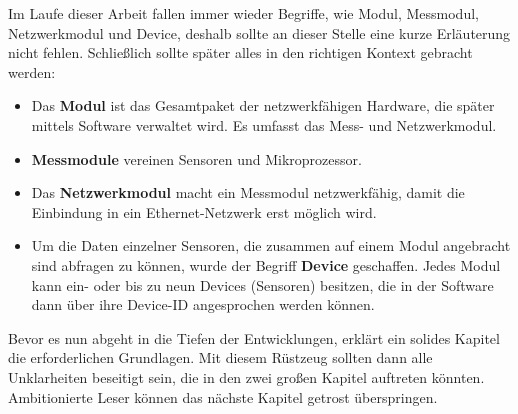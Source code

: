 \documentclass[a4paper,14pt,headsepline]{scrartcl}
\begin{document}
\newpage

\begin{figure}[h]
\begin{center}
\end{center}
\end{figure}

Im Laufe dieser Arbeit fallen immer wieder Begriffe, wie Modul, Messmodul, Netzwerkmodul und Device, deshalb sollte an dieser Stelle eine kurze Erläuterung nicht fehlen. Schließlich sollte später alles in den richtigen Kontext gebracht werden:

\begin{itemize}

\item Das \textbf{Modul} ist das Gesamtpaket der netzwerkfähigen Hardware, die später mittels Software verwaltet wird. Es umfasst das Mess- und Netzwerkmodul.
\item \textbf{Messmodule} vereinen Sensoren und Mikroprozessor. 
\item Das \textbf{Netzwerkmodul} macht ein Messmodul netzwerkfähig, damit die Einbindung in ein Ethernet-Netzwerk erst möglich wird.
\item Um die Daten einzelner Sensoren, die zusammen auf einem Modul angebracht sind abfragen zu können, wurde der Begriff \textbf{Device} geschaffen. Jedes Modul kann ein- oder bis zu neun Devices (Sensoren) besitzen, die in der Software dann über ihre Device-ID angesprochen werden können.

\end{itemize}

Bevor es nun abgeht in die Tiefen der Entwicklungen, erklärt ein solides Kapitel die erforderlichen Grundlagen. Mit diesem Rüstzeug sollten dann alle Unklarheiten beseitigt sein, die in den zwei großen Kapitel auftreten könnten. Ambitionierte Leser können das nächste Kapitel getrost überspringen. 
\end{document}
